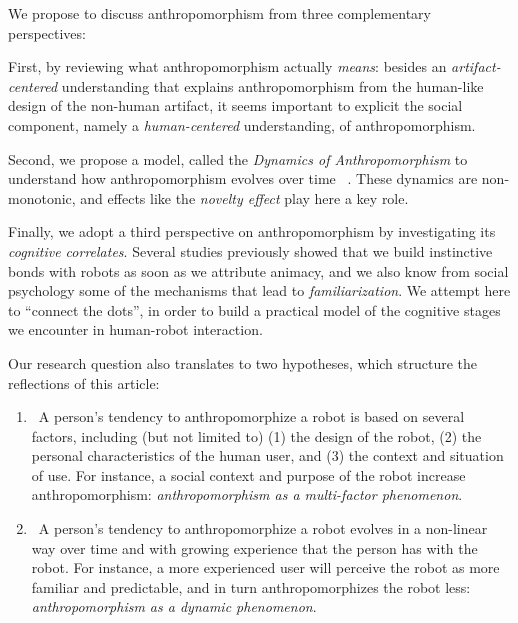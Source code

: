 \documentclass{frontiersSCNS} %
\begin{document}
We propose to discuss anthropomorphism from three
complementary perspectives: 

First, by reviewing what anthropomorphism actually \emph{means}: besides an
\emph{artifact-centered} understanding that explains anthropomorphism from the
human-like design of the non-human artifact, it seems important to explicit the
social component, namely a \emph{human-centered} understanding, of
anthropomorphism.

Second, we propose a model, called the \textit{Dynamics of Anthropomorphism} to
understand how anthropomorphism evolves over time
~\citep{lemaignan2014dynamics}.  These dynamics are non-monotonic, and effects
like the \emph{novelty effect} play here a key role.

Finally, we adopt a third perspective on anthropomorphism by investigating its
\emph{cognitive correlates}. Several studies previously showed that we build
instinctive bonds with robots as soon as we attribute animacy, and we also know
from social psychology some of the mechanisms that lead to
\emph{familiarization}. We attempt here to ``connect the dots'', in order to
build a practical model of the cognitive stages we encounter in human-robot
interaction.


Our research question also translates to two
hypotheses, which structure the reflections of this article:

\begin{enumerate} 
\item ~A person's tendency to anthropomorphize a robot
    is based on several factors, including (but not limited to) (1) the
    design of the robot, (2) the personal characteristics of the human user,
    and (3) the context and situation of use. For instance, a social context
    and purpose of the robot increase anthropomorphism: \textit{anthropomorphism
    as a multi-factor phenomenon}.

\item ~A person's tendency to anthropomorphize a robot
    evolves in a non-linear way over time and with growing experience that the
    person has with the robot. For instance, a more experienced user will
    perceive the robot as more familiar and predictable, and in turn
    anthropomorphizes the robot less: \textit{anthropomorphism as a dynamic
    phenomenon}.

\end{enumerate}
\end{document}
